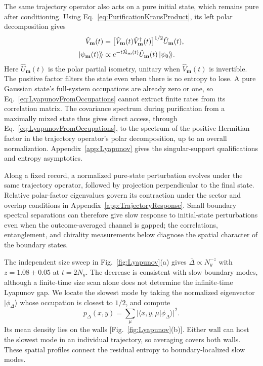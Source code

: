 \documentclass[aps,prb,10pt,twocolumn,superscriptaddress,longbibliography,floatfix]{revtex4-2}
\newcommand{\kett}[1]{\ket{#1}\!\rangle}
\newcommand{\rec}{\mathbf m}   %
\begin{document}
{The same trajectory operator also acts on a pure initial state, which remains pure after conditioning. Using Eq.~\eqref{eq:PurificationKrausProduct}, its left polar decomposition gives
\begin{equation}
 \begin{aligned}
 \hat V_{\rec}(t)&=\big[\hat V_{\rec}(t)\hat V_{\rec}^\dagger(t)\big]^{1/2}\hat U_{\rec}(t),\\
 \kett{\psi_{\rec}(t)}&\propto e^{-t\hat{\mathcal H}_{\rec}(t)}\hat U_{\rec}(t)\kett{\psi_0}.
 \end{aligned}
 \label{eq:PureTrajectoryFiltering}
\end{equation}
Here $\hat U_{\rec}(t)$ is the polar partial isometry, unitary when $\hat V_{\rec}(t)$ is invertible. The positive factor filters the state even when there is no entropy to lose. A pure Gaussian state's full-system occupations are already zero or one, so Eq.~\eqref{eq:LyapunovFromOccupations} cannot extract finite rates from its correlation matrix. The covariance spectrum during purification from a maximally mixed state thus gives direct access, through Eq.~\eqref{eq:LyapunovFromOccupations}, to the spectrum of the positive Hermitian factor in the trajectory operator's polar decomposition, up to an overall normalization. Appendix~\ref{app:Lyapunov} gives the singular-support qualifications and entropy asymptotics.

Along a fixed record, a normalized pure-state perturbation evolves under the same trajectory operator, followed by projection perpendicular to the final state. Relative polar-factor eigenvalues govern its contraction under the sector and overlap conditions in Appendix~\ref{app:TrajectoryResponse}. Small boundary spectral separations can therefore give slow response to initial-state perturbations even when the outcome-averaged channel is gapped; the correlations, entanglement, and chirality measurements below diagnose the spatial character of the boundary states.

The independent size sweep in Fig.~\ref{fig:Lyapunov}(a) gives $\overline\Delta\propto N_y^{-z}$ with $z=1.08\pm0.05$ at $t=2N_y$. The decrease is consistent with slow boundary modes, although a finite-time size scan alone does not determine the infinite-time Lyapunov gap. We locate the slowest mode by taking the normalized eigenvector $|\phi_{\Delta}\rangle$ whose occupation is closest to $1/2$, and compute
\begin{equation}
 p_{\Delta}(x,y)=\sum_\mu|\langle x,y,\mu|\phi_{\Delta}\rangle|^2.
 \label{eq:SlowestModeDensity}
\end{equation}
Its mean density lies on the walls [Fig.~\ref{fig:Lyapunov}(b)]. Either wall can host the slowest mode in an individual trajectory, so averaging covers both walls. These spatial profiles connect the residual entropy to boundary-localized slow modes.

}
\end{document}
